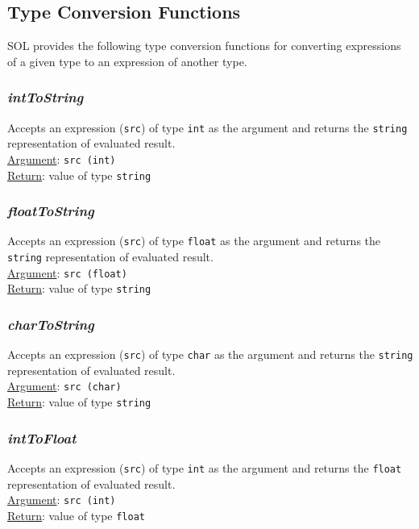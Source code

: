     \subsection{Type Conversion Functions}
    SOL provides the following type conversion functions for converting expressions of a given type to an expression of another type.

        \subsubsection{\textit{intToString}}
        Accepts an expression (\texttt{src}) of type \texttt{int} as the argument and returns the \texttt{string} representation of evaluated result.\\
        \underline{Argument}: \texttt{src (int)}\\
        \underline{Return}: value of type \texttt{string}

        \subsubsection{\textit{floatToString}}
        Accepts an expression (\texttt{src}) of type \texttt{float} as the argument and returns the \texttt{string} representation of evaluated result.\\
        \underline{Argument}: \texttt{src (float)}\\
        \underline{Return}: value of type \texttt{string}

        \subsubsection{\textit{charToString}}
        Accepts an expression (\texttt{src}) of type \texttt{char} as the argument and returns the \texttt{string} representation of evaluated result.\\
        \underline{Argument}: \texttt{src (char)}\\
        \underline{Return}: value of type \texttt{string}

        \subsubsection{\textit{intToFloat}}
        Accepts an expression (\texttt{src}) of type \texttt{int} as the argument and returns the \texttt{float} representation of evaluated result.\\
        \underline{Argument}: \texttt{src (int)}\\
        \underline{Return}: value of type \texttt{float}

